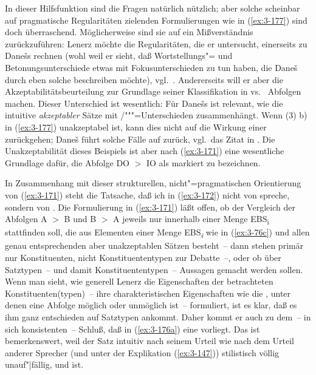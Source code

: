 \documentclass[output=paper]{langsci/langscibook}
\begin{document}
In dieser Hilfsfunktion sind die Fragen natürlich nützlich; aber
solche scheinbar auf pragmatische Regularitäten zielenden
Formulierungen wie in (\ref{ex:3-177}) sind doch überraschend. Möglicherweise
sind sie auf ein Mißverständnis zurückzuführen: Lenerz möchte die
Regularitäten, die er untersucht, einerseits zu Dane\v{s}s  rechnen (wohl weil er sieht, daß Wortstellungs"= und
Betonungsunterschiede etwas mit Fokusunterschieden zu tun haben, die
Dane\v{s} durch eben solche  beschreiben möchte),
vgl.\ \citet[26f]{Lenerz77}. Andererseits will er aber die Akzeptabilitätsbeurteilung zur Grundlage seiner Klassifikation in  vs.\  Abfolgen
machen. Dieser Unterschied ist wesentlich: Für Dane\v{s}s  ist relevant, wie die intuitive  \textit{akzeptabler} Sätze mit
/"""=Unterschieden zusammenhängt. Wenn (3) b) in (\ref{ex:3-177}) unakzeptabel ist, kann dies nicht auf die Wirkung einer  zurückgehen; Dane\v{s} führt solche Fälle auf
 zurück, vgl.\ das Zitat in \citet[27]{Lenerz77}. Die
Unakzeptabilität dieses Beispiels ist aber nach (\ref{ex:3-171}) eine wesentliche
Grundlage dafür, die Abfolge DO $>$ IO als markiert zu bezeichnen.

In Zusammenhang mit dieser strukturellen, nicht"=pragmatischen
Orientierung von (\ref{ex:3-171}) steht die Tatsache, daß ich in (\ref{ex:3-172}) nicht von
 spreche, sondern von . Die Formulierung in (\ref{ex:3-171}) läßt offen, ob der Vergleich der Abfolgen A $>$ B und B $>$ A jeweils nur innerhalb einer Menge EBS\rlap{\textsuperscript{\small \raisebox{-2pt}{*}}}\textsubscript{\small i} stattfinden soll, die aus Elementen einer Menge EBS\textit{\textsubscript{i}}
wie in (\ref{ex:3-76c}) und allen genau entsprechenden aber unakzeptablen
Sätzen besteht~-- dann stehen primär nur Konstituenten, nicht
Konstituententypen zur Debatte~--, oder ob über Satztypen~-- und damit
Konstituententypen~-- Aussagen gemacht werden sollen. Wenn man sieht,
wie generell Lenerz die Eigenschaften der betrachteten
Konstituenten(typen)~-- ihre charakteristischen Eigenschaften wie die
, unter denen eine Abfolge möglich oder unmöglich
ist~-- formuliert, ist es klar, daß es ihm ganz entschieden auf
Satztypen ankommt. Daher kommt er auch \zb zu dem~-- in sich
konsistenten~-- Schluß, daß in (\ref{ex:3-176a}) eine 
vorliegt. Das ist bemerkenswert, weil der Satz intuitiv nach seinem
Urteil wie nach dem Urteil anderer Sprecher (und unter der Explikation
(\ref{ex:3-147})) stilistisch völlig unauf"|fällig,  und
 ist.
\end{document}
